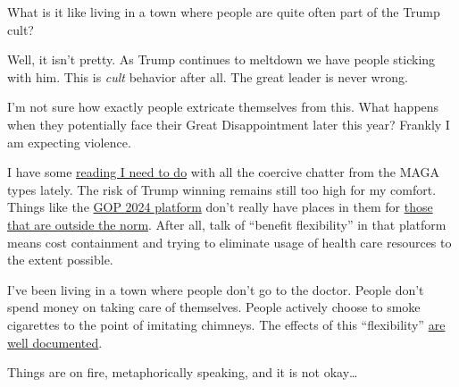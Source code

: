 What is it like living in a town where people are quite often part of
the Trump cult?

Well, it isn't pretty. As Trump continues to meltdown we have people
sticking with him. This is \emph{cult} behavior after all. The great
leader is never wrong.

I'm not sure how exactly people extricate themselves from this. What
happens when they potentially face their Great Disappointment later this
year? Frankly I am expecting violence.

I have some
\href{https://humanrights.gov.au/our-work/asylum-seekers-and-refugees/asylum-seekers-and-refugees-guide}{reading
I need to do} with all the coercive chatter from the MAGA types lately.
The risk of Trump winning remains still too high for my comfort. Things
like the
\href{https://www.presidency.ucsb.edu/documents/2024-republican-party-platform}{GOP
2024 platform} don't really have places in them for
\href{https://my.clevelandclinic.org/health/diseases/24548-pten-hamartoma-tumor-syndrome}{those
that are outside the norm}. After all, talk of ``benefit flexibility''
in that platform means cost containment and trying to eliminate usage of
health care resources to the extent possible.

I've been living in a town where people don't go to the doctor. People
don't spend money on taking care of themselves. People actively choose
to smoke cigarettes to the point of imitating chimneys. The effects of
this ``flexibility''
\href{https://www.washingtonpost.com/health/interactive/2023/republican-politics-south-midwest-life-expectancy/}{are
well documented}.

Things are on fire, metaphorically speaking, and it is not okay\ldots{}
